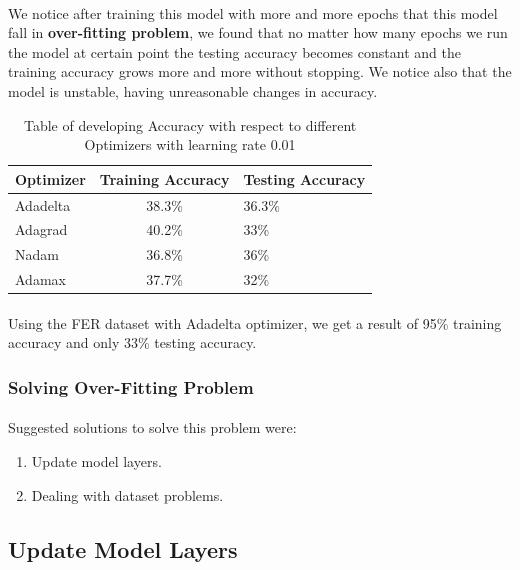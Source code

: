 \paragraph{}
We notice after training this model with more and more epochs that this model fall in \textbf{over-fitting problem}, we found that no matter how many epochs we run the model at certain point the testing accuracy becomes constant and the training accuracy grows more and more without stopping. We notice also that the model is unstable, having unreasonable changes in accuracy. 
\begin{table}[h!]
	\begin{center}
		\caption{Table of developing Accuracy with respect to different Optimizers with learning rate 0.01 \newline}
		\label{tab:optimizers}
		\begin{tabular}{l|c|l}
			\textbf{Optimizer} & \textbf{Training Accuracy} & \textbf{Testing Accuracy}\\ 
			\hline 
			Adadelta & 38.3\% & 36.3\% \\
			Adagrad & 40.2\% & 33\%\\
			Nadam & 36.8\% & 36\% \\
			Adamax & 37.7\% & 32\% \\
		\end{tabular}
	\end{center}
\end{table}
\paragraph{}
Using the FER dataset with Adadelta optimizer, we get a result of 95\% training accuracy and only 33\% testing accuracy.
\subsubsection{Solving Over-Fitting Problem}
\paragraph{} Suggested solutions to solve this problem were:
\begin{enumerate}
	\item Update model layers.
	\item Dealing with dataset problems.
\end{enumerate}
\subsection{Update Model Layers}
